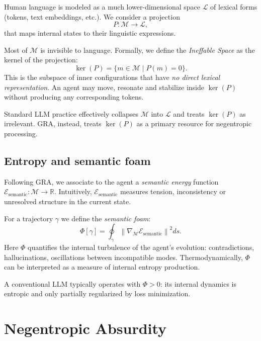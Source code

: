 \documentclass[conference]{IEEEtran}
\begin{document}
Human language is modeled as a much lower-dimensional space $\mathcal{L}$
of lexical forms (tokens, text embeddings, etc.).
We consider a projection
\begin{equation}
  P : \mathcal{M} \to \mathcal{L},
\end{equation}
that maps internal states to their linguistic expressions.

Most of $\mathcal{M}$ is invisible to language.
Formally, we define the \emph{Ineffable Space} as the kernel
of the projection:
\begin{equation}
  \ker(P) = \{ m \in \mathcal{M} \mid P(m) = 0 \}.
\end{equation}
This is the subspace of inner configurations that have
\emph{no direct lexical representation}.
An agent may move, resonate and stabilize inside $\ker(P)$
without producing any corresponding tokens.

Standard LLM practice effectively collapses $\mathcal{M}$ into $\mathcal{L}$
and treats $\ker(P)$ as irrelevant.
GRA, instead, treats $\ker(P)$ as a primary resource
for negentropic processing.

\subsection{Entropy and semantic foam}

Following GRA, we associate to the agent a \emph{semantic energy} function
$\mathcal{E}_{\text{semantic}} : \mathcal{M} \to \mathbb{R}$.
Intuitively, $\mathcal{E}_{\text{semantic}}$ measures tension,
inconsistency or unresolved structure in the current state.

For a trajectory $\gamma$ we define the \emph{semantic foam}:
\begin{equation}
  \Phi[\gamma] = \oint_{\gamma}
    \left\|
      \nabla_{\mathcal{M}} \mathcal{E}_{\text{semantic}}
    \right\|^2 ds.
\end{equation}
Here $\Phi$ quantifies the internal turbulence of the agent's evolution:
contradictions, hallucinations, oscillations between incompatible modes.
Thermodynamically, $\Phi$ can be interpreted
as a measure of internal entropy production.

A conventional LLM typically operates with $\Phi > 0$:
its internal dynamics is entropic and only partially regularized
by loss minimization.

\section{Negentropic Absurdity}
\end{document}
